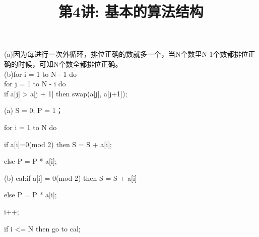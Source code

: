 \documentclass[a4paper, justified]{tufte-handout}
\title{第4讲: 基本的算法结构}
\date{\zhtoday} %
\begin{document}
\maketitle
\noplagiarism %
\begin{abstract}
  \begin{center}{}
  \end{center}
\end{abstract}
\beginrequired

\begin{problem}[DH 2.2: Bubblesort]
\end{problem}

\begin{solution}
  (a)因为每进行一次外循环，排位正确的数就多一个，当N个数里N-1个数都排位正确的时候，可知N个数全都排位正确。\\
  (b)for i = 1 to N - 1 do\\
  \quad for j = 1 to N - i do\\
  \quad if a[j] > a[j + 1] then swap(a[j], a[j+1]);
\end{solution}

\begin{problem}
\end{problem}

\begin{solution}
  (a) S = 0; P = 1；

  for i = 1 to N do

  if a[i]=0(mod 2) then S = S + a[i];

  else P = P * a[i];

  (b) cal:if a[i] = 0(mod 2) then S = S + a[i]

  else P = P * a[i];

  i++;

  if i <= N then go to cal;

\end{solution}
\end{document}
